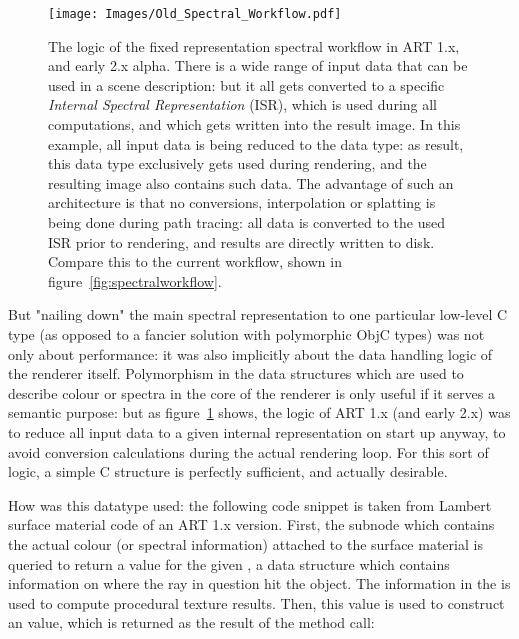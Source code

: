 \begin{figure}[htb]
\begin{center}
\texttt{[image: Images/Old\_Spectral\_Workflow.pdf]} 
\end{center}
\caption{
\label{fig:old_spectralworkflow}
The logic of the fixed representation spectral workflow in ART 1.x, and early 2.x alpha. There is a wide range of input data that can be used in a scene description: but it all gets converted to a specific \emph{Internal Spectral Representation} (ISR), which is used during all computations, and which gets written into the result image. In this example, all input data is being reduced to the  data type: as result, this data type exclusively gets used during rendering, and the resulting  image also contains such data. The advantage of such an architecture is that no conversions, interpolation or splatting is being done during path tracing: all data is converted to the used ISR prior to rendering, and results are directly written to disk. Compare this to the current workflow, shown in figure~\ref{fig:spectralworkflow}.
}
\end{figure}

But "nailing down" the main spectral representation to one particular low-level C type (as opposed to a fancier solution with polymorphic ObjC types) was not only about performance: it was also implicitly about the data handling logic of the renderer itself. Polymorphism in the data structures which are used to describe colour or spectra in the core of the renderer is only useful if it serves a semantic purpose: but as figure~\ref{fig:old_spectralworkflow} shows, the logic of ART 1.x (and early 2.x) was to reduce all input data to a given internal representation on start up anyway, to avoid conversion calculations during the actual rendering loop. For this sort of logic, a simple C structure is perfectly sufficient, and actually desirable.

How was this  datatype used: the following code snippet is taken from Lambert surface material code of an ART 1.x version. First, the subnode which contains the actual colour (or spectral information) attached to the surface material is queried to return a  value for the given , \ie a data structure which contains information on where the ray in question hit the object. The information in the  is \eg used to compute procedural texture results. Then, this  value is used to construct an  value, which is returned as the result of the method call: 

